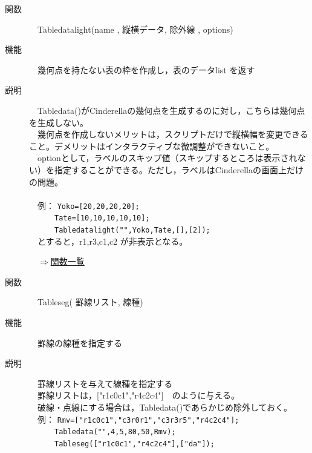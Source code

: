 \documentclass[papersize,a4paper,12pt,uplatex]{jsarticle}
\begin{document}
\begin{description}
\hypertarget{tabledatalight}{}
\item[関数]　Tabledatalight(name , 縦横データ, 除外線 , options)
\item[機能]　幾何点を持たない表の枠を作成し，表のデータlist を返す
\item[説明]　Tabledata()がCinderellaの幾何点を生成するのに対し，こちらは幾何点を生成しない。\\
　幾何点を作成しないメリットは，スクリプトだけで縦横幅を変更できること。デメリットはインタラクティブな微調整ができないこと。\\
　optionとして，ラベルのスキップ値（スキップするところは表示されない）を指定することができる。ただし，ラベルはCinderellaの画面上だけの問題。\\
　\\
　例： \verb|Yoko=[20,20,20,20];|\\
　　　\verb|Tate=[10,10,10,10,10];|\\
　　　\verb|Tabledatalight("",Yoko,Tate,[],[2]);|\\
　とすると，r1,r3,c1,c2 が非表示となる。\\


\begin{flushright}　\hyperlink{functionlist}{$\Rightarrow$関数一覧}\end{flushright}

\hypertarget{tableseg}{}
\item[関数]　Tableseg( 罫線リスト, 線種)
\item[機能]　罫線の線種を指定する
\item[説明]　罫線リストを与えて線種を指定する\\
　罫線リストは，["r1c0c1","r4c2c4"]　のように与える。\\
　破線・点線にする場合は，Tabledata()であらかじめ除外しておく。\\

　例： \verb|Rmv=["r1c0c1","c3r0r1","c3r3r5","r4c2c4"];|\\
　　　\verb|Tabledata("",4,5,80,50,Rmv);|\\
　　　\verb|Tableseg(["r1c0c1","r4c2c4"],["da"]);|\\

　　　　　\\


\end{description}
\end{document}
